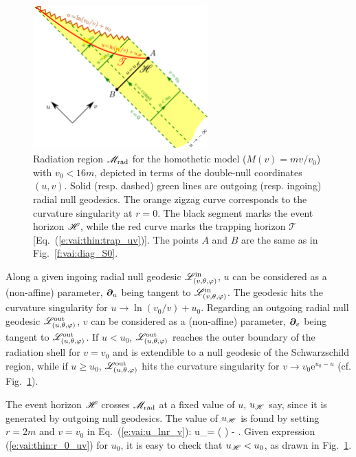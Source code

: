 \begin{figure}
\centerline{\includegraphics[width=0.6\textwidth]{vai_thin_double_null.pdf}}
\caption[]{\label{f:vai:thin_double_null} \footnotesize
Radiation region $\mathscr{M}_{\rm rad}$ for the homothetic model ($M(v) = m v/v_0$) with $v_0 < 16m$,
depicted in terms of the double-null coordinates
$(u, v)$. Solid (resp. dashed) green lines are outgoing (resp. ingoing)
radial null geodesics. The orange zigzag curve corresponds to the curvature
singularity at $r=0$.
The black segment marks the event horizon $\mathscr{H}$, while the red curve marks the trapping horizon
$\mathscr{T}$ [Eq.~(\ref{e:vai:thin:trap_uv})].
The points $A$ and $B$ are the same as in Fig.~\ref{f:vai:diag_S0}.
}
\end{figure}



Along a given ingoing radial null geodesic $\mathscr{L}^{\rm in}_{(v,\theta,\varphi)}$,
$u$ can be considered as a (non-affine) parameter, $\bm{\partial}_u$
being tangent to $\mathscr{L}^{\rm in}_{(v,\theta,\varphi)}$. The geodesic hits the curvature
singularity for $u \to \ln(v_0/v) + u_0$.
Regarding an outgoing radial null geodesic $\mathscr{L}^{\rm out}_{(u,\theta,\varphi)}$,
$v$ can be considered as a (non-affine) parameter, $\bm{\partial}_v$
being tangent to $\mathscr{L}^{\rm out}_{(u,\theta,\varphi)}$. If $u < u_0$,
$\mathscr{L}^{\rm out}_{(u,\theta,\varphi)}$ reaches the outer boundary of the radiation
shell for $v=v_0$ and is extendible to a null geodesic of the Schwarzschild
region, while if $u \geq u_0$, $\mathscr{L}^{\rm out}_{(u,\theta,\varphi)}$ hits the
curvature singularity for $v \to v_0 \mathrm{e}^{u_0 - u}$
(cf. Fig.~\ref{f:vai:thin_double_null}).

The event horizon $\mathscr{H}$ crosses $\mathscr{M}_{\rm rad}$ at a fixed value of $u$, $u_{\mathscr{H}}$ say,
since it is generated by outgoing null geodesics. The value of $u_{\mathscr{H}}$ is found
by setting $r=2m$ and $v=v_0$ in Eq.~(\ref{e:vai:u_lnr_v}):
\be \label{e:vai:thin:u_H}
    u_\Hor = \arctan\left( \right)
    -  .
\ee
Given expression
(\ref{e:vai:thin:r_0_uv}) for $u_0$, it is easy to check that $u_{\mathscr{H}} < u_0$,
as drawn in Fig.~\ref{f:vai:thin_double_null}.


